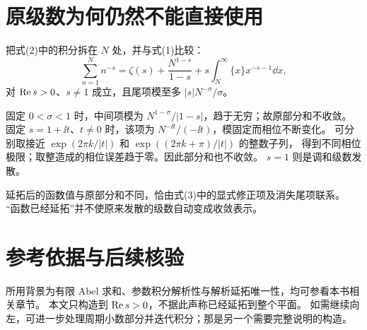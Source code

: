 \documentclass[UTF8,fontset=fandol,11pt]{ctexart}
\begin{document}
\section{原级数为何仍然不能直接使用}
把式(2)中的积分拆在 $N$ 处，并与式(1)比较：
\[
 \sum_{n=1}^Nn^{-s}
 =\zeta(s)+\frac{N^{1-s}}{1-s}
   +s\int_N^\infty\{x\}x^{-s-1}\dd x,           \tag{3}
\]
对 $\operatorname{Re} s>0$、$s\ne1$ 成立，且尾项模至多
$|s|N^{-\sigma}/\sigma$。

固定 $0<\sigma<1$ 时，中间项模为
$N^{1-\sigma}/|1-s|$，趋于无穷；故原部分和不收敛。
固定 $s=1+\ii t$、$t\ne0$ 时，该项为
$N^{-\ii t}/(-\ii t)$，模固定而相位不断变化。
可分别取接近 $\exp(2\pi k/|t|)$ 和 $\exp((2\pi k+\pi)/|t|)$ 的整数子列，
得到不同相位极限；取整造成的相位误差趋于零。因此部分和也不收敛。
$s=1$ 则是调和级数发散。

延拓后的函数值与原部分和不同，恰由式(3)中的显式修正项及消失尾项联系。
“函数已经延拓”并不使原来发散的级数自动变成收敛表示。

\section*{参考依据与后续核验}
所用背景为有限 Abel 求和、参数积分解析性与解析延拓唯一性，均可参看本书相关章节。
本文只构造到 $\operatorname{Re} s>0$，不据此声称已经延拓到整个平面。
如需继续向左，可进一步处理周期小数部分并迭代积分；那是另一个需要完整说明的构造。
\end{document}
